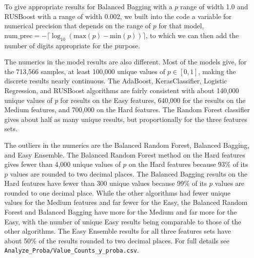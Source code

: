 To give appropriate results for Balanced Bagging with a $p$ range of width 1.0 and RUSBoost with a range of width 0.002, we built into the code a variable for numerical precision that depends on the range of $p$ for that model, $\text{num\_prec} = - \lceil \log_{10} ( \text{max}(p) - \text{min}(p) )  \rceil$, to which we can then add the number of digits appropriate for the purpose.  

The numerics in the model results are also different.  Most of the models give, for the 713,566 samples, at least 100,000 unique values of $p \in [0,1]$, making the discrete results nearly continuous.  The AdaBoost, KerasClassifier, Logistic Regression, and RUSBoost algorithms are fairly consistent with about 140,000 unique values of $p$ for results on the Easy features, 640,000 for the results on the Medium features, and 700,000 on the Hard features.  The Random Forest classifier gives about half as many unique results, but proportionally for the three features sets.

The outliers in the numerics are the Balanced Random Forest, Balanced Bagging, and Easy Ensemble.  The Balanced Random Forest method on the Hard features gives fewer than 4,000 unique values of $p$ on the Hard features because 93\% of its $p$ values are rounded to two decimal places.  The Balanced Bagging results on the Hard features have fewer than 300 unique values because 99\% of its $p$ values are rounded to one decimal place.  While the other algorithms had fewer unique values for the Medium features and far fewer for the Easy, the Balanced Random Forest and Balanced Bagging have more for the Medium and far more for the Easy, with the number of unique Easy results being comparable to those of the other algorithms.  The Easy Ensemble results for all three features sets have about 50\% of the results rounded to two decimal places.  For full details see \verb|Analyze_Proba/Value_Counts_y_proba.csv|.







\FloatBarrier

